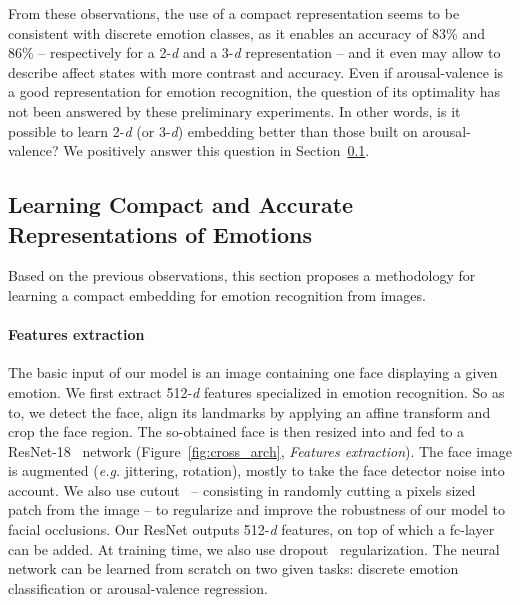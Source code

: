 \documentclass{bmvc2k}
\begin{document}
From these observations, the use of a compact representation seems to be consistent with discrete emotion classes, as it enables an accuracy of 83\% and 86\% -- respectively for a 2-\textit{d} and a 3-\textit{d} representation -- and it even may allow to describe affect states with more contrast and accuracy. 
Even if arousal-valence is a good representation for emotion recognition, the question of its optimality has not been answered by these preliminary experiments. In other words, is it possible to learn 2-\textit{d} (or 3-\textit{d}) embedding better than those built on arousal-valence? We positively answer this question in Section~\ref{subsec:method}. 

\subsection{Learning Compact and Accurate Representations of Emotions}
\label{subsec:method}
Based on the previous observations, this section proposes a methodology for learning a compact embedding for emotion recognition from images.
\paragraph{Features extraction}
The basic input of our model is an image containing one face displaying a given emotion. We first extract 512-\textit{d} features specialized in emotion recognition.
So as to, we detect the face, align its landmarks by applying an affine transform and crop the face region. The so-obtained face is then resized into  and fed to a ResNet-18~\cite{he_deep_2015} network (Figure~\ref{fig:cross_arch}, \textit{Features extraction}). The face image is augmented (\textit{e.g.} jittering, rotation), mostly to take the face detector noise into account. We also use cutout~\cite{devries_improved_2017} -- consisting in randomly cutting a  pixels sized patch from the image -- to regularize and improve the robustness of our model to facial occlusions.
Our ResNet outputs 512-\textit{d} features, on top of which a fc-layer can be added. At training time, we also use dropout~\cite{srivastava2014dropout} regularization.
The neural network can be learned from scratch on two given tasks: discrete emotion classification or arousal-valence regression. 
\end{document}
